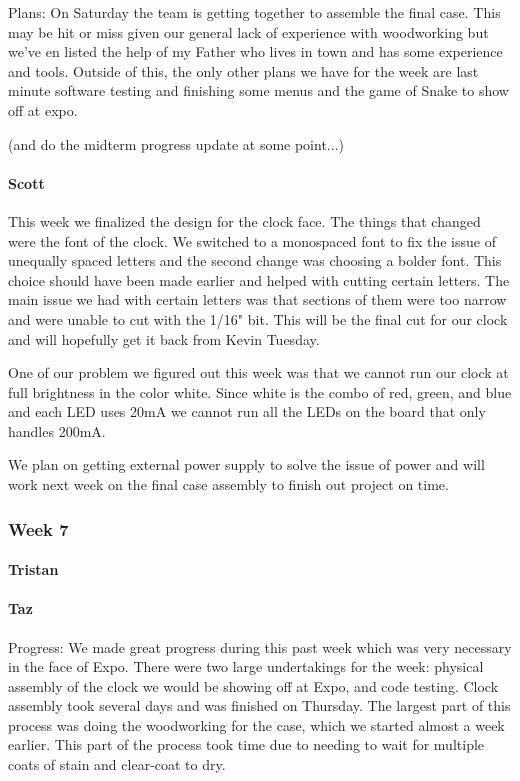 \documentclass[onecolumn, draftclsnofoot,10pt, compsoc]{IEEEtran}
\begin{document}
Plans: On Saturday the team is getting together to assemble the final case. This may be hit or miss given our general lack of experience with woodworking but we've en listed the help of my Father who lives in town and has some experience and tools. Outside of this, the only other plans we have for the week are last minute software testing and finishing some menus and the game of Snake to show off at expo.

(and do the midterm progress update at some point...)
\paragraph{Scott}
This week we finalized the design for the clock face. The things that changed were the font of the clock. We switched to a monospaced font to fix the issue of unequally spaced letters and the second change was choosing a bolder font. This choice should have been made earlier and helped with cutting certain letters. The main issue we had with certain letters was that sections of them were too narrow and were unable to cut with the 1/16" bit. This will be the final cut for our clock and will hopefully get it back from Kevin Tuesday.

One of our problem we figured out this week was that we cannot run our clock at full brightness in the color white. Since white is the combo of red, green, and blue and each LED uses 20mA we cannot run all the LEDs on the board that only handles 200mA.

We plan on getting external power supply to solve the issue of power and will work next week on the final case assembly to finish out project on time.
\subsubsection{Week 7}
\paragraph{Tristan}

\paragraph{Taz}
Progress: We made great progress during this past week which was very necessary in the face of Expo. There were two large undertakings for the week: physical assembly of the clock we would be showing off at Expo, and code testing. Clock assembly took several days and was finished on Thursday. The largest part of this process was doing the woodworking for the case, which we started almost a week earlier. This part of the process took time due to needing to wait for multiple coats of stain and clear-coat to dry.
\end{document}
